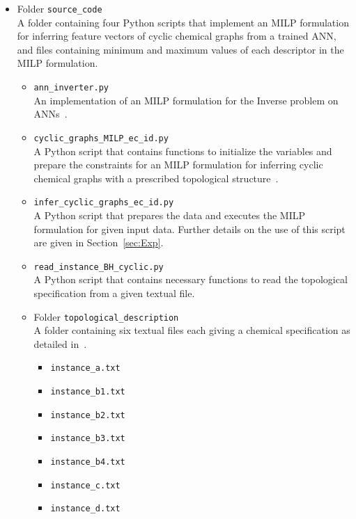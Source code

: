 \documentclass[11pt,titlepage,dvipdfmx,twoside]{book}
\begin{document}
\begin{itemize}

\item Folder {\tt source\_code}\\
A folder containing four Python scripts that implement
an MILP formulation for inferring feature vectors
of cyclic chemical graphs from a trained ANN,
and files containing minimum and maximum values
of each descriptor
in the MILP formulation.

\begin{itemize}

\item {\tt ann\_inverter.py}\\
An implementation of an MILP formulation 
for the Inverse problem on  ANNs~\cite{AN19}.

\item {\tt cyclic\_graphs\_MILP\_ec\_id.py}\\
A Python script that contains functions to initialize the variables and prepare 
the constraints for an MILP
formulation for inferring cyclic chemical graphs with 
a prescribed topological structure~\cite{AN20}.

\item {\tt infer\_cyclic\_graphs\_ec\_id.py}\\
A Python script that prepares the data and executes 
the MILP formulation for given input data.
Further details on the use of this script
are given in Section~\ref{sec:Exp}.

\item {\tt read\_instance\_BH\_cyclic.py}\\
A Python script that contains necessary functions
to read the topological specification from a given textual file.

\item Folder {\tt topological\_description}\\
A folder containing six textual files each giving a chemical specification as detailed 
in~\cite{AN20}.
%
\begin{itemize}
 \item {\tt instance\_a.txt} 
 \item {\tt instance\_b1.txt} 
 \item {\tt instance\_b2.txt} 
 \item {\tt instance\_b3.txt}
 \item {\tt instance\_b4.txt}  
 \item {\tt instance\_c.txt} 
 \item {\tt instance\_d.txt} 
\end{itemize}


\end{itemize}
\end{itemize}
\end{document}
